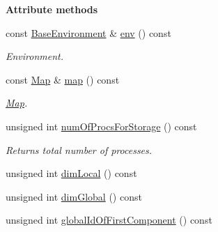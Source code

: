 \begin{Indent}{\bf Attribute methods}\par
\begin{DoxyCompactItemize}
\item 
const \hyperlink{class_q_u_e_s_o_1_1_base_environment}{Base\-Environment} \& \hyperlink{class_q_u_e_s_o_1_1_vector_space_aa74cd0d1a8b3d599f799ef4aa2ebcfc2}{env} () const 
\begin{DoxyCompactList}\small\item\em Environment. \end{DoxyCompactList}\item 
const \hyperlink{class_q_u_e_s_o_1_1_map}{Map} \& \hyperlink{class_q_u_e_s_o_1_1_vector_space_ac2f40e646c62513ea9a6819b82e8ba24}{map} () const 
\begin{DoxyCompactList}\small\item\em \hyperlink{class_q_u_e_s_o_1_1_map}{Map}. \end{DoxyCompactList}\item 
unsigned int \hyperlink{class_q_u_e_s_o_1_1_vector_space_a67b0c3620662116f5a346fdaa5faf38e}{num\-Of\-Procs\-For\-Storage} () const 
\begin{DoxyCompactList}\small\item\em Returns total number of processes. \end{DoxyCompactList}\item 
unsigned int \hyperlink{class_q_u_e_s_o_1_1_vector_space_a5829a1f4f996f8307c840b705144d666}{dim\-Local} () const 
\item 
unsigned int \hyperlink{class_q_u_e_s_o_1_1_vector_space_acd4359dc120905c22ca1064e33787239}{dim\-Global} () const 
\item 
unsigned int \hyperlink{class_q_u_e_s_o_1_1_vector_space_a6cfb48f3058abca35b23c65147217f64}{global\-Id\-Of\-First\-Component} () const 
\end{DoxyCompactItemize}
\end{Indent}

